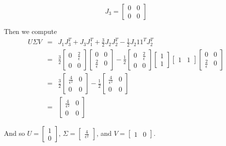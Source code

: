\documentclass[12pt]{article}
\begin{document}
\begin{equation}
J_3 = \begin{bmatrix}
0 & 0 \\
0 & 0
\end{bmatrix}
\end{equation}


Then we compute
\begin{eqnarray}
U \Sigma V &=& 
J_1 J_3^T + J_3 J_1^T + \frac{3}{2} J_2 J_2^T - \frac{1}{2} J_2 1 1^T J_2^T \\
&=& \frac{3}{2} 
\begin{bmatrix} 0 & \frac{2}{\epsilon} \\ 0 & 0 \end{bmatrix}
\begin{bmatrix} 0 & 0 \\ \frac{2}{\epsilon} & 0 \end{bmatrix}
-\frac{1}{2}
\begin{bmatrix} 0 & \frac{2}{\epsilon} \\ 0 & 0 \end{bmatrix}
\begin{bmatrix} 1 \\ 1 \end{bmatrix}
\begin{bmatrix} 1 & 1 \end{bmatrix}
\begin{bmatrix} 0 & 0 \\ \frac{2}{\epsilon} & 0 \end{bmatrix} \\
&=& \frac{3}{2}
\begin{bmatrix} \frac{4}{\epsilon^2} & 0 \\ 0 & 0 \end{bmatrix}
-\frac{1}{2}
\begin{bmatrix} \frac{4}{\epsilon^2} & 0 \\ 0 & 0 \end{bmatrix} \\
&=& \begin{bmatrix} \frac{4}{\epsilon^2} & 0 \\ 0 & 0 \end{bmatrix}
\end{eqnarray}

And so 
$U = \begin{bmatrix} 1 \\ 0 \end{bmatrix}$, 
$\Sigma = \begin{bmatrix} \frac{4}{\epsilon^2} \end{bmatrix}$, and
$V = \begin{bmatrix} 1 & 0 \end{bmatrix}$.
\end{document}
